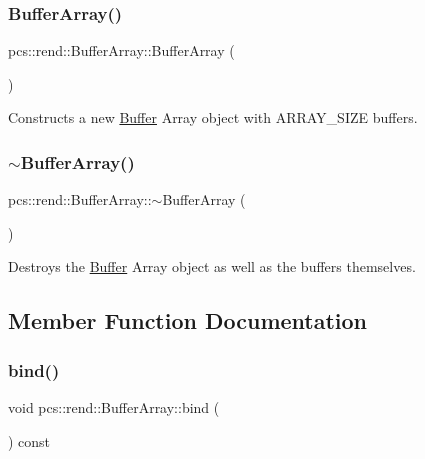 \subsubsection{\texorpdfstring{Buffer\+Array()}{BufferArray()}}
{\footnotesize\ttfamily pcs\+::rend\+::\+Buffer\+Array\+::\+Buffer\+Array (\begin{DoxyParamCaption}{ }\end{DoxyParamCaption})}



Constructs a new \hyperlink{classpcs_1_1rend_1_1Buffer}{Buffer} Array object with A\+R\+R\+A\+Y\+\_\+\+S\+I\+ZE buffers. 

\mbox{\label{classpcs_1_1rend_1_1BufferArray_a4492755723fc99752c811bfe7520d993}} 
\subsubsection{\texorpdfstring{$\sim$\+Buffer\+Array()}{~BufferArray()}}
{\footnotesize\ttfamily pcs\+::rend\+::\+Buffer\+Array\+::$\sim$\+Buffer\+Array (\begin{DoxyParamCaption}{ }\end{DoxyParamCaption})\hspace{0.3cm}{\ttfamily [virtual]}}



Destroys the \hyperlink{classpcs_1_1rend_1_1Buffer}{Buffer} Array object as well as the buffers themselves. 



\subsection{Member Function Documentation}
\mbox{\label{classpcs_1_1rend_1_1BufferArray_ab170f51886678c0c027acdf604915eb7}} 
\subsubsection{\texorpdfstring{bind()}{bind()}}
{\footnotesize\ttfamily void pcs\+::rend\+::\+Buffer\+Array\+::bind (\begin{DoxyParamCaption}{ }\end{DoxyParamCaption}) const\hspace{0.3cm}{\ttfamily [inline]}}



